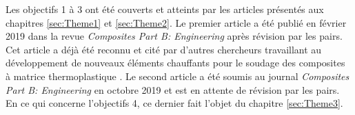 Les objectifs 1 à 3 ont été couverts et atteints par les articles présentés aux chapitres \ref{sec:Theme1} et \ref{sec:Theme2}. 
Le premier article \cite{Brassard2019a} a été publié en février 2019 dans la revue \textit{Composites Part B: Engineering} après révision par les pairs. 
Cet article a déjà été reconnu et cité par d'autres chercheurs travaillant au développement de nouveaux éléments chauffants pour le soudage des composites à matrice thermoplastique \cite{Russello2019}. 
Le second article a été soumis au journal \textit{Composites Part B: Engineering} en octobre 2019 et est en attente de révision par les pairs. 
En ce qui concerne l'objectifs 4, ce dernier fait l'objet du chapitre \ref{sec:Theme3}. 